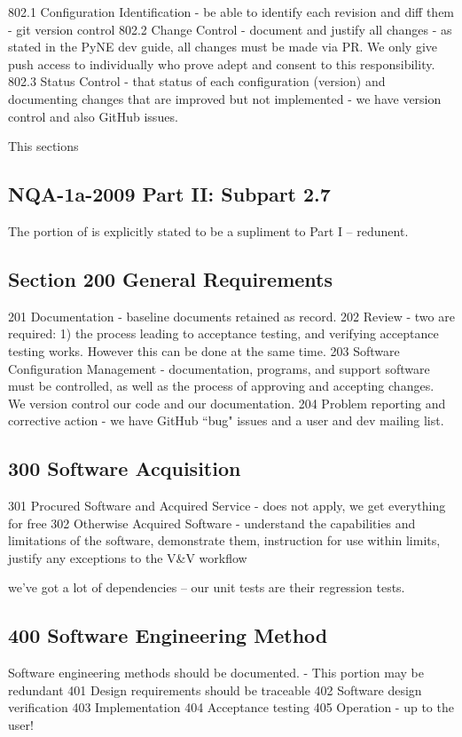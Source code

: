 \documentclass{anstrans}
\begin{document}
802.1 Configuration Identification - be able to identify each revision and diff them - git version control
802.2 Change Control - document and justify all changes - as stated in the PyNE dev guide, all changes must be made via PR. We only give push access to individually who prove adept and consent to this responsibility.
802.3 Status Control - that status of each configuration (version) and documenting changes that are improved but not implemented - we have version control and also GitHub issues.

This sections 



\subsection{NQA-1a-2009 Part II: Subpart 2.7}

The portion of is explicitly stated to be a supliment to Part I -- redunent.

\subsection{Section 200 General Requirements}

201 Documentation - baseline documents retained as record.
202 Review  - two are required: 1) the process leading to acceptance testing, and verifying acceptance testing works. However this can be done at the same time.
203 Software Configuration Management - documentation, programs, and support software must be controlled, as well as the process of approving and accepting changes. We version control our code and our documentation.
204 Problem reporting and corrective action - we have GitHub ``bug" issues and a user and dev mailing list.

\subsection{300 Software Acquisition}
301 Procured Software and Acquired Service - does not apply, we get everything for free
302 Otherwise Acquired Software - understand the capabilities and limitations of the software, demonstrate them, instruction for use within limits, justify any exceptions to the V\&V workflow

we've got a lot of dependencies -- our unit tests are their regression tests.

\subsection{400 Software Engineering Method}
Software engineering methods should be documented.
- This portion may be redundant
401 Design requirements should be traceable
402 Software design verification
403 Implementation
404 Acceptance testing
405 Operation - up to the user!
\end{document}
